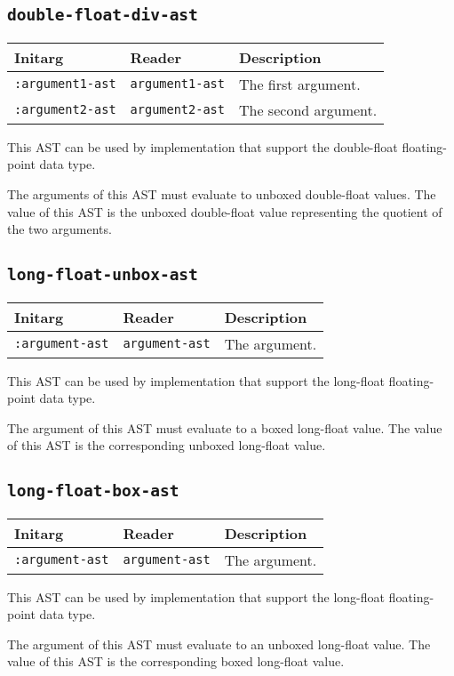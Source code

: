 \subsection{\texttt{double-float-div-ast}}
\label{sec-ast-double-float-div}

\begin{tabular}{|l|l|l|}
\hline
Initarg & Reader & Description\\
\hline\hline
\texttt{:argument1-ast} & \texttt{argument1-ast} & The first argument.\\
\hline
\texttt{:argument2-ast} & \texttt{argument2-ast} & The second argument.\\
\hline
\end{tabular}

This AST can be used by implementation that support the double-float
floating-point data type.  

The arguments of this AST must evaluate to unboxed double-float
values.  The value of this AST is the unboxed double-float value
representing the quotient of the two arguments.

\subsection{\texttt{long-float-unbox-ast}}
\label{sec-ast-long-float-unbox}

\begin{tabular}{|l|l|l|}
\hline
Initarg & Reader & Description\\
\hline\hline
\texttt{:argument-ast} & \texttt{argument-ast} & The argument.\\
\hline
\end{tabular}

This AST can be used by implementation that support the long-float
floating-point data type.  

The argument of this AST must evaluate to a boxed long-float value.
The value of this AST is the corresponding unboxed long-float value.

\subsection{\texttt{long-float-box-ast}}
\label{sec-ast-long-float-box}

\begin{tabular}{|l|l|l|}
\hline
Initarg & Reader & Description\\
\hline\hline
\texttt{:argument-ast} & \texttt{argument-ast} & The argument.\\
\hline
\end{tabular}

This AST can be used by implementation that support the long-float
floating-point data type.  

The argument of this AST must evaluate to an unboxed long-float
value.  The value of this AST is the corresponding boxed long-float
value.
